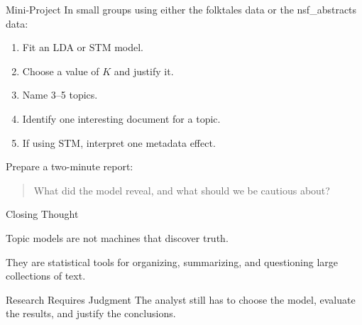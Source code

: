 \documentclass[aspectratio=169]{beamer}
\begin{document}
\begin{frame}{Mini-Project}
In small groups using either the folktales data or the nsf\_abstracts data:

\begin{enumerate}
  \item Fit an LDA or STM model.
  \item Choose a value of $K$ and justify it.
  \item Name 3--5 topics.
  \item Identify one interesting document for a topic.
  \item If using STM, interpret one metadata effect.
\end{enumerate}

\vspace{0.4cm}
Prepare a two-minute report:

\begin{quote}
What did the model reveal, and what should we be cautious about?
\end{quote}
\end{frame}

\begin{frame}{Closing Thought}

\Large

Topic models are not machines that discover truth.

\vspace{0.5cm}

They are statistical tools for organizing, summarizing, and questioning large collections of text.

\vspace{0.6cm}

\begin{alertblock}{Research Requires Judgment}
The analyst still has to choose the model, evaluate the results, and justify the conclusions.
\end{alertblock}

\end{frame}
\end{document}
